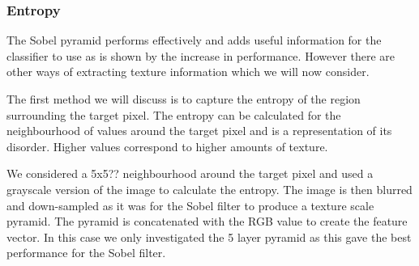 \documentclass[12pt]{IIBproject}
\begin{document}
 



\subsubsection{Entropy}
The Sobel pyramid performs effectively and adds useful information for the classifier to use as is shown by the increase in performance. However there are other ways of extracting texture information which we will now consider.
 
The first method we will discuss is to capture the entropy of the region surrounding the target pixel. The entropy can be calculated for the neighbourhood of values around the target pixel and is a representation of its disorder. Higher values correspond to higher amounts of texture. 

We considered a 5x5?? neighbourhood around the target pixel and used a grayscale version of the image to calculate the entropy. The image is then blurred and down-sampled as it was for the Sobel filter to produce a texture scale pyramid. The pyramid is concatenated with the RGB value to create the feature vector. In this case we only investigated the 5 layer pyramid as this gave the best performance for the Sobel filter. 
\end{document}
